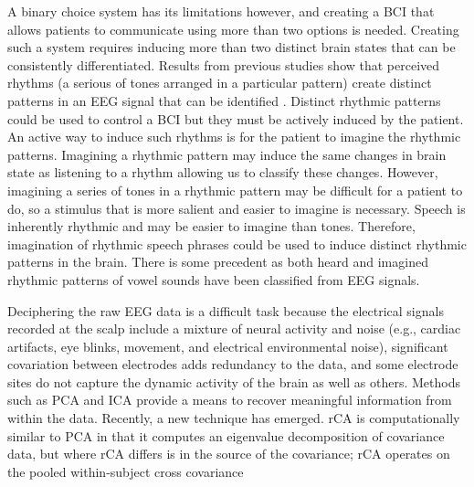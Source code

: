 \documentclass[utf8]{frontiersSCNS} %
\begin{document}
A binary choice system has its limitations however, and creating a \ac{BCI} that allows patients to communicate using more than two options is needed.
Creating such a system requires inducing more than two distinct brain states that can be consistently differentiated.
Results from previous studies show that perceived rhythms (a serious of tones arranged in a particular pattern) create distinct patterns in an EEG signal that can be identified \citep{stober2014}.
Distinct rhythmic patterns could be used to control a \ac{BCI} but they must be actively induced by the patient. 
An active way to induce such rhythms is for the patient to imagine the rhythmic patterns. 
Imagining a rhythmic pattern may induce the same changes in brain state as listening to a rhythm allowing us to classify these changes.
However, imagining a series of tones in a rhythmic pattern may be difficult for a patient to do, so a stimulus that is more salient and easier to imagine is necessary.
Speech is inherently rhythmic and may be easier to imagine than tones. 
Therefore, imagination of rhythmic speech phrases could be used to induce distinct rhythmic patterns in the brain.
There is some precedent as both heard \citep{Formisano2008} and imagined \citep{Deng2010} rhythmic patterns of vowel sounds have been classified from EEG signals. 

Deciphering the raw \ac{EEG} data is a difficult task because the electrical signals recorded at the scalp include a mixture of neural activity and noise (e.g., cardiac artifacts, eye blinks, movement, and electrical environmental noise), significant covariation between electrodes adds redundancy to the data, and some electrode sites do not capture the dynamic activity of the brain as well as others. 
Methods such as \ac{PCA} and \ac{ICA} provide a means to recover meaningful information from within the data. 
Recently, a new technique has emerged.
\ac{rCA} is computationally similar to \ac{PCA} in that it computes an eigenvalue decomposition of covariance data, but where \ac{rCA} differs is in the source of the covariance; \ac{rCA} operates on the pooled within-subject cross covariance
\end{document}
